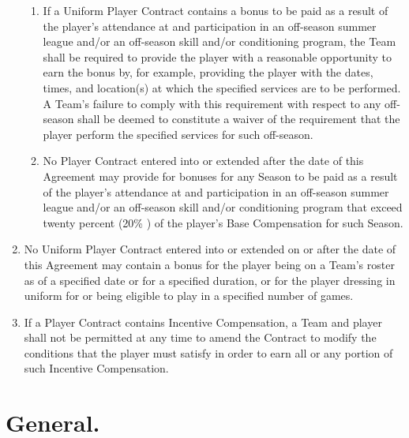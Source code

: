 \documentclass[
]{book}
\begin{document}
\begin{enumerate}
\begin{enumerate}
  \item
    If a Uniform Player Contract contains a bonus to be paid as a result of the player's attendance at and participation in an off-season summer league and/or an off-season skill and/or conditioning program, the Team shall be required to provide the player with a reasonable opportunity to earn the bonus by, for example, providing the player with the dates, times, and location(s) at which the specified services are to be performed. A Team's failure to comply with this requirement with respect to any off-season shall be deemed to constitute a waiver of the requirement that the player perform the specified services for such off-season.
  \item
    No Player Contract entered into or extended after the date of this Agreement may provide for bonuses for any Season to be paid as a result of the player's attendance at and participation in an off-season summer league and/or an off-season skill and/or conditioning program that exceed twenty percent (20\% ) of the player's Base Compensation for such Season.
  \end{enumerate}
\item
  No Uniform Player Contract entered into or extended on or after the date of this Agreement may contain a bonus for the player being on a Team's roster as of a specified date or for a specified duration, or for the player dressing in uniform for or being eligible to play in a specified number of games.
\item
  If a Player Contract contains Incentive Compensation, a Team and player shall not be permitted at any time to amend the Contract to modify the conditions that the player must satisfy in order to earn all or any portion of such Incentive Compensation.
\end{enumerate}

\hypertarget{general.}{%
\section{General.}\label{general.}}
\end{document}
